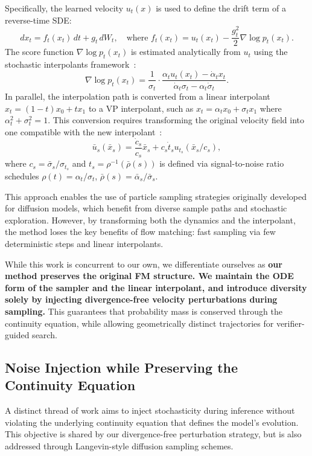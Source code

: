\documentclass{article}
\begin{document}
Specifically, the learned velocity \( u_t(x) \) is used to define the drift term of a reverse-time SDE:
\[
d x_t = f_t(x_t)\,dt + g_t\,dW_t, \quad \text{where } f_t(x_t) = u_t(x_t) - \frac{g_t^2}{2} \nabla \log p_t(x_t).
\]
The score function \( \nabla \log p_t(x_t) \) is estimated analytically from \( u_t \) using the stochastic interpolants framework~\cite{ma2024sit}:
\[
\nabla \log p_t(x_t) = \frac{1}{\sigma_t} \cdot \frac{\alpha_t u_t(x_t) - \dot{\alpha}_t x_t}{\dot{\alpha}_t \sigma_t - \alpha_t \dot{\sigma}_t}.
\]
In parallel, the interpolation path is converted from a linear interpolant \( x_t = (1 - t)x_0 + t x_1 \) to a VP interpolant, such as \( x_t = \alpha_t x_0 + \sigma_t x_1 \) where \(\alpha_t^2 + \sigma_t^2 = 1\). This conversion requires transforming the original velocity field into one compatible with the new interpolant~\cite{kim2025flowits}:
\[
\bar{u}_s(\bar{x}_s) = \frac{\dot{c}_s}{c_s} \bar{x}_s + c_s \dot{t}_s u_{t_s}(\bar{x}_s / c_s),
\]
where \(c_s = \bar{\sigma}_s / \sigma_{t_s}\) and \(t_s = \rho^{-1}(\bar{\rho}(s))\) is defined via signal-to-noise ratio schedules \(\rho(t) = \alpha_t/\sigma_t\), \(\bar{\rho}(s) = \bar{\alpha}_s/\bar{\sigma}_s\).

This approach enables the use of particle sampling strategies originally developed for diffusion models, which benefit from diverse sample paths and stochastic exploration. However, by transforming both the dynamics and the interpolant, the method loses the key benefits of flow matching: fast sampling via few deterministic steps and linear interpolants.

While this work is concurrent to our own, we differentiate ourselves as \textbf{our method preserves the original FM structure. We maintain the ODE form of the sampler and the linear interpolant, and introduce diversity solely by injecting divergence-free velocity perturbations during sampling.} This guarantees that probability mass is conserved through the continuity equation, while allowing geometrically distinct trajectories for verifier-guided search.

\subsection{Noise Injection while Preserving the Continuity Equation}

A distinct thread of work aims to inject stochasticity during inference without violating the underlying continuity equation that defines the model's evolution. This objective is shared by our divergence-free perturbation strategy, but is also addressed through Langevin-style diffusion sampling schemes.
\end{document}
